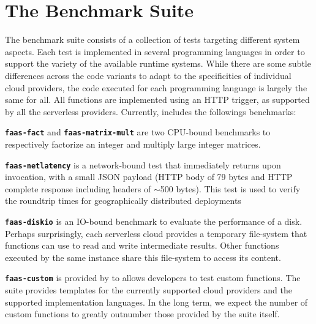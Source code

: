 \section{The \sys Benchmark Suite}
\label{sec:tests}

The \sys benchmark suite consists of a collection of tests targeting different system aspects.
Each test is implemented in several programming languages in order to support the variety of the available runtime systems.
While there are some subtle differences across the code variants to adapt to the specificities of individual cloud providers, the code executed for each programming language is largely the same for all.
All functions are implemented using an \gls{HTTP} trigger, as supported by all the serverless providers.
Currently, \sys includes the followings benchmarks:

\textbf{\texttt{faas-fact}} and \textbf{\texttt{faas-matrix-mult}} are two CPU-bound benchmarks to respectively factorize an integer and multiply large integer matrices.

\textbf{\texttt{faas-netlatency}} is a network-bound test that immediately returns upon invocation, with a small \gls{JSON} payload (HTTP body of 79 bytes and HTTP complete response including headers of $\sim$500 bytes). This test is used to verify the roundtrip times for geographically distributed deployments

\textbf{\texttt{faas-diskio}} is an IO-bound benchmark to evaluate the performance of a disk. 
Perhaps surprisingly, each serverless cloud provides a temporary file-system that functions can use to read and write intermediate results. 
Other functions executed by the same instance share this file-system to access its content.

\textbf{\texttt{faas-custom}} is provided by \sys to allows developers to test custom functions. 
The suite provides templates for the currently supported cloud providers and the supported implementation languages. 
In the long term, we expect the number of custom functions to greatly outnumber those provided by the suite itself.

